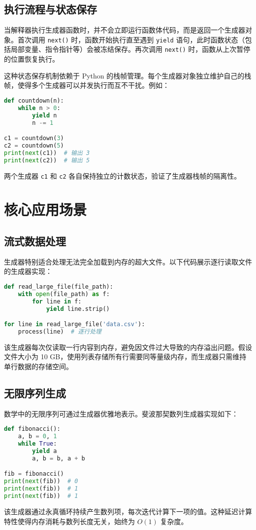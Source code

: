 \section{执行流程与状态保存}
当解释器执行生成器函数时，并不会立即运行函数体代码，而是返回一个生成器对象。首次调用 \verb!next()! 时，函数开始执行直至遇到 \verb!yield! 语句，此时函数状态（包括局部变量、指令指针等）会被冻结保存。再次调用 \verb!next()! 时，函数从上次暂停的位置恢复执行。\par
这种状态保存机制依赖于 Python 的栈帧管理。每个生成器对象独立维护自己的栈帧，使得多个生成器可以并发执行而互不干扰。例如：\par
\begin{lstlisting}[language=python]
def countdown(n):
    while n > 0:
        yield n
        n -= 1

c1 = countdown(3)
c2 = countdown(5)
print(next(c1))  # 输出 3
print(next(c2))  # 输出 5
\end{lstlisting}
两个生成器 \verb!c1! 和 \verb!c2! 各自保持独立的计数状态，验证了生成器栈帧的隔离性。\par
\chapter{核心应用场景}
\section{流式数据处理}
生成器特别适合处理无法完全加载到内存的超大文件。以下代码展示逐行读取文件的生成器实现：\par
\begin{lstlisting}[language=python]
def read_large_file(file_path):
    with open(file_path) as f:
        for line in f:
            yield line.strip()

for line in read_large_file('data.csv'):
    process(line)  # 逐行处理
\end{lstlisting}
该生成器每次仅读取一行内容到内存，避免因文件过大导致的内存溢出问题。假设文件大小为 10 GB，使用列表存储所有行需要同等量级内存，而生成器只需维持单行数据的存储空间。\par
\section{无限序列生成}
数学中的无限序列可通过生成器优雅地表示。斐波那契数列生成器实现如下：\par
\begin{lstlisting}[language=python]
def fibonacci():
    a, b = 0, 1
    while True:
        yield a
        a, b = b, a + b

fib = fibonacci()
print(next(fib))  # 0
print(next(fib))  # 1
print(next(fib))  # 1
\end{lstlisting}
该生成器通过永真循环持续产生数列项，每次迭代计算下一项的值。这种延迟计算特性使得内存消耗与数列长度无关，始终为 $O(1)$ 复杂度。\par
